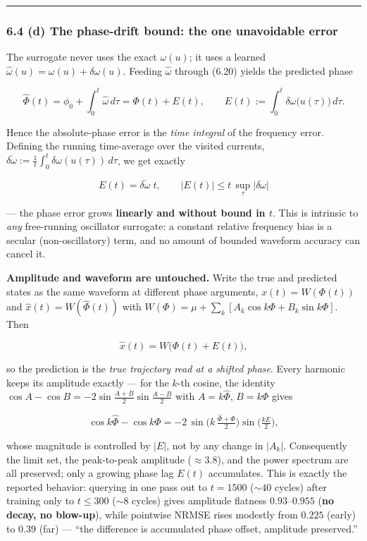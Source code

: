 \documentclass[
  11pt,
]{article}
\begin{document}
\begin{center}\rule{0.5\linewidth}{0.5pt}\end{center}

\subsubsection{6.4 (d) The phase-drift bound: the one unavoidable
error}\label{d-the-phase-drift-bound-the-one-unavoidable-error}

The surrogate never uses the exact \(\omega(u)\); it uses a learned
\(\hat\omega(u)=\omega(u)+\delta\omega(u)\). Feeding \(\hat\omega\)
through (6.20) yields the predicted phase

\[
\hat\Phi(t)=\phi_0+\int_0^t\hat\omega\,d\tau=\Phi(t)+E(t),\qquad
E(t):=\int_0^t\delta\omega\big(u(\tau)\big)\,d\tau .
\tag{6.23}
\]

Hence the absolute-phase error is the \emph{time integral} of the
frequency error. Defining the running time-average over the visited
currents,
\(\overline{\delta\omega}:=\tfrac1t\int_0^t\delta\omega(u(\tau))\,d\tau\),
we get exactly

\[
\boxed{\ E(t)=\overline{\delta\omega}\;t,\qquad |E(t)|\le t\,\sup_\tau|\delta\omega|\ }
\tag{6.24}
\]

--- the phase error grows \textbf{linearly and without bound in \(t\)}.
This is intrinsic to \emph{any} free-running oscillator surrogate: a
constant relative frequency bias is a secular (non-oscillatory) term,
and no amount of bounded waveform accuracy can cancel it.

\textbf{Amplitude and waveform are untouched.} Write the true and
predicted states as the same waveform at different phase arguments,
\(x(t)=W(\Phi(t))\) and \(\hat x(t)=W(\hat\Phi(t))\) with
\(W(\Phi)=\mu+\sum_k[A_k\cos k\Phi+B_k\sin k\Phi]\). Then

\[
\hat x(t)=W\big(\Phi(t)+E(t)\big),
\tag{6.25}
\]

so the prediction is the \emph{true trajectory read at a shifted phase}.
Every harmonic keeps its amplitude exactly --- for the \(k\)-th cosine,
the identity \(\cos A-\cos B=-2\sin\frac{A+B}{2}\sin\frac{A-B}{2}\) with
\(A=k\hat\Phi\), \(B=k\Phi\) gives

\[
\cos k\hat\Phi-\cos k\Phi=-2\,\sin\!\Big(k\,\tfrac{\hat\Phi+\Phi}{2}\Big)\sin\!\Big(\tfrac{kE}{2}\Big),
\]

whose magnitude is controlled by \(|E|\), not by any change in
\(|A_k|\). Consequently the limit set, the peak-to-peak amplitude
(\(\approx3.8\)), and the power spectrum are all preserved; only a
growing phase lag \(E(t)\) accumulates. This is exactly the reported
behavior: querying in one pass out to \(t=1500\) (\(\sim40\) cycles)
after training only to \(t\le300\) (\(\sim8\) cycles) gives amplitude
flatness \(0.93\)--\(0.955\) (\textbf{no decay, no blow-up}), while
pointwise NRMSE rises modestly from \(0.225\) (early) to \(0.39\) (far)
--- ``the difference is accumulated phase offset, amplitude preserved.''
\end{document}
